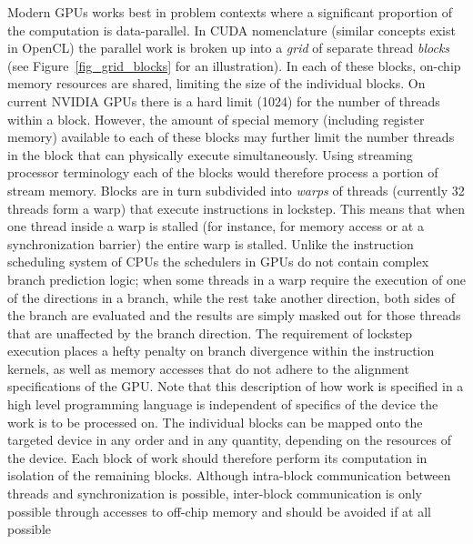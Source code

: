Modern GPUs works best in problem contexts where a significant proportion of the computation is data-parallel. In CUDA nomenclature (similar concepts exist in OpenCL) the parallel work is broken up into a \textit{grid} of
separate thread \textit{blocks} (see Figure~\ref{fig_grid_blocks} for an illustration). In each of these blocks, on-chip memory resources are shared, limiting the size of the individual blocks. On current NVIDIA GPUs there is a hard limit (1024) for the number of 
threads within a block. However, the amount of special memory (including register memory) available to each of these blocks may further limit the number threads in the block that can physically execute simultaneously. Using streaming processor terminology 
each of the blocks would therefore process a portion of stream memory. Blocks are in turn subdivided into \textit{warps} of threads (currently 32 threads form a warp) that execute instructions in lockstep. This means that when one
thread inside a warp is stalled (for instance, for memory access or at a synchronization barrier) the entire warp is stalled. Unlike the instruction scheduling system of CPUs the schedulers in GPUs do not contain complex branch prediction logic; when some
threads in a warp require the execution of one of the directions in a branch, while the rest take another direction, both sides of the branch are evaluated and the results are simply masked out for those threads that are unaffected
by the branch direction. The requirement of lockstep execution places a hefty penalty on branch divergence within the instruction kernels, as well as memory accesses that do not adhere to the alignment specifications of the GPU. Note that this description of how work 
is specified in a high level programming language is independent of specifics of the device the work is to be processed on. The individual blocks can be mapped onto the targeted device 
in any order and in any quantity, depending on the resources of the device. Each block of work should therefore perform its computation in isolation of the remaining blocks. Although 
intra-block communication between threads and synchronization is possible, inter-block communication is only possible through accesses to off-chip memory and should be avoided if at all possible
